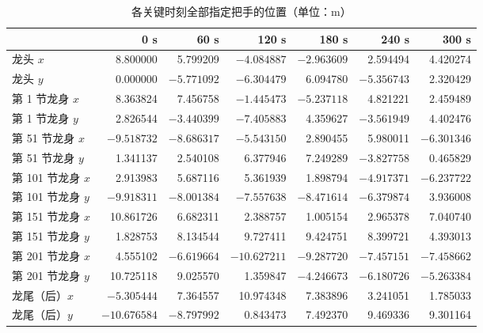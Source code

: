 ﻿\documentclass{cumcmthesis}
\begin{document}
\begin{table}[H]
\centering
\caption{各关键时刻全部指定把手的位置（单位：m）}
\label{tab:pos}
\scriptsize\setlength{\tabcolsep}{3.6pt}
\renewcommand{\arraystretch}{1.08}
\begin{tabular}{lrrrrrr}
\toprule
 & 0 s & 60 s & 120 s & 180 s & 240 s & 300 s \\
\midrule
龙头 $x$ & 8.800000 & 5.799209 & $-4.084887$ & $-2.963609$ & 2.594494 & 4.420274 \\
龙头 $y$ & 0.000000 & $-5.771092$ & $-6.304479$ & 6.094780 & $-5.356743$ & 2.320429 \\
第 1 节龙身 $x$ & 8.363824 & 7.456758 & $-1.445473$ & $-5.237118$ & 4.821221 & 2.459489 \\
第 1 节龙身 $y$ & 2.826544 & $-3.440399$ & $-7.405883$ & 4.359627 & $-3.561949$ & 4.402476 \\
第 51 节龙身 $x$ & $-9.518732$ & $-8.686317$ & $-5.543150$ & 2.890455 & 5.980011 & $-6.301346$ \\
第 51 节龙身 $y$ & 1.341137 & 2.540108 & 6.377946 & 7.249289 & $-3.827758$ & 0.465829 \\
第 101 节龙身 $x$ & 2.913983 & 5.687116 & 5.361939 & 1.898794 & $-4.917371$ & $-6.237722$ \\
第 101 节龙身 $y$ & $-9.918311$ & $-8.001384$ & $-7.557638$ & $-8.471614$ & $-6.379874$ & 3.936008 \\
第 151 节龙身 $x$ & 10.861726 & 6.682311 & 2.388757 & 1.005154 & 2.965378 & 7.040740 \\
第 151 节龙身 $y$ & 1.828753 & 8.134544 & 9.727411 & 9.424751 & 8.399721 & 4.393013 \\
第 201 节龙身 $x$ & 4.555102 & $-6.619664$ & $-10.627211$ & $-9.287720$ & $-7.457151$ & $-7.458662$ \\
第 201 节龙身 $y$ & 10.725118 & 9.025570 & 1.359847 & $-4.246673$ & $-6.180726$ & $-5.263384$ \\
龙尾（后）$x$ & $-5.305444$ & 7.364557 & 10.974348 & 7.383896 & 3.241051 & 1.785033 \\
龙尾（后）$y$ & $-10.676584$ & $-8.797992$ & 0.843473 & 7.492370 & 9.469336 & 9.301164 \\
\bottomrule
\end{tabular}
\end{table}
\end{document}
